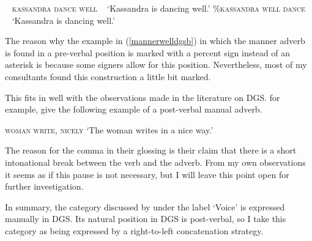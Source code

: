 \begin{exe}
\ex\label{mannerwelldgs}\begin{xlist}
\ex \textcolor{white}{\%}\textsc{kassandra dance well} 
\glt \textcolor{white}{\%}`Kassandra is dancing well.' \label{mannerwelldgsa}
\ex \%\textsc{kassandra well dance} 
\glt \textcolor{white}{\%}`Kassandra is dancing well.' \label{mannerwelldgsb}
\end{xlist}
\end{exe}

\noindent The reason why the example in (\ref{mannerwelldgsb}) in which the manner adverb is found in a pre-verbal position is marked with a percent sign instead of an asterisk is because some signers allow for this position. Nevertheless, most of my consultants found this construction a little bit marked.


This fits in well with the observations made in the literature on DGS. \citet[282]{happ2014vork} for example, give the following example of a post-verbal manual adverb.

\begin{exe}
\ex \textsc{woman write, nicely}
\glt `The woman writes in a nice way.'
\end{exe}

\noindent The reason for the comma in their glossing is their claim that there is a short intonational break between the verb and the adverb. From my own observations it seems as if this pause is not necessary, but I will leave this point open for further investigation.

In summary, the category discussed by \citet{cinque1999adverbs} under the label `Voice' is expressed manually in DGS.  Its natural position in DGS is post-verbal, so I take this category as being expressed by a right-to-left concatenation strategy.



